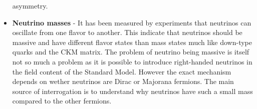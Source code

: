 \begin{itemize}
            asymmetry.
        \item \textbf{Neutrino masses} - It has been measured by experiments that neutrinos
            can oscillate from one flavor to another. This indicate that neutrinos should
            be massive and have different flavor states than mass states much like down-type
            quarks and the CKM matrix. The problem of neutrino being massive is itself not
            so much a problem as it is possible to introduce right-handed neutrinos in the
            field content of the Standard Model. However the exact mechanism depends on
            wether neutrinos are Dirac or Majorana fermions. The main source of interrogation
            is to understand why neutrinos have such a small mass compared to the other
            fermions.
    \end{itemize}

